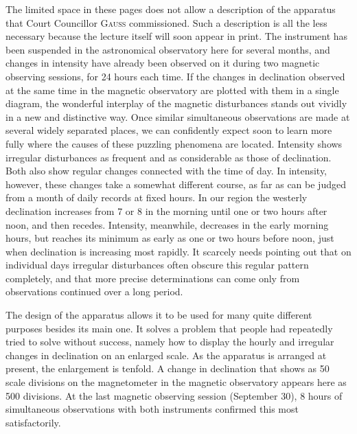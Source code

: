 The limited space in these pages does not allow a description of the apparatus that Court Councillor \textsc{Gauss} commissioned. Such a description is all the less necessary because the lecture itself will soon appear in print. The instrument has been suspended in the astronomical observatory here for several months, and changes in intensity have already been observed on it during two magnetic observing sessions, for 24 hours each time. If the changes in declination observed at the same time in the magnetic observatory are plotted with them in a single diagram, the wonderful interplay of the magnetic disturbances stands out vividly in a new and distinctive way. Once similar simultaneous observations are made at several widely separated places, we can confidently expect soon to learn more fully where the causes of these puzzling phenomena are located. Intensity shows irregular disturbances as frequent and as considerable as those of declination. Both also show regular changes connected with the time of day. In intensity, however, these changes take a somewhat different course, as far as can be judged from a month of daily records at fixed hours. In our region the westerly declination increases from 7 or 8 in the morning until one or two hours after noon, and then recedes. Intensity, meanwhile, decreases in the early morning hours, but reaches its minimum as early as one or two hours before noon, just when declination is increasing most rapidly. It scarcely needs pointing out that on individual days irregular disturbances often obscure this regular pattern completely, and that more precise determinations can come only from observations continued over a long period.

The design of the apparatus allows it to be used for many quite different purposes besides its main one. It solves a problem that people had repeatedly tried to solve without success, namely how to display the hourly and irregular changes in declination on an enlarged scale. As the apparatus is arranged at present, the enlargement is tenfold. A change in declination that shows as 50 scale divisions on the magnetometer in the magnetic observatory appears here as 500 divisions. At the last magnetic observing session (September 30), 8 hours of simultaneous observations with both instruments confirmed this most satisfactorily.

